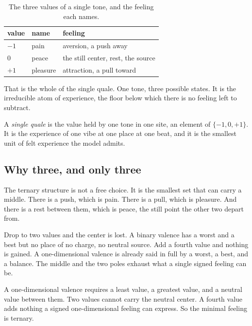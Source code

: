 \begin{table}[ht]
\centering
\begin{tabular}{@{}lll@{}}
\toprule
value & name & feeling \\
\midrule
$-1$ & pain & aversion, a push away \\
$0$ & peace & the still center, rest, the source \\
$+1$ & pleasure & attraction, a pull toward \\
\bottomrule
\end{tabular}
\caption{The three values of a single tone, and the feeling each names.}
\label{tab:single-tone-values}
\end{table}

That is the whole of the single quale. One tone, three possible states. It is the irreducible atom of experience, the floor below which there is no feeling left to subtract.

\begin{definition}
A \emph{single quale} is the value held by one tone in one site, an element of $\{-1, 0, +1\}$. It is the experience of one vibe at one place at one beat, and it is the smallest unit of felt experience the model admits.
\end{definition}

\subsection{Why three, and only three}

The ternary structure is not a free choice. It is the smallest set that can carry a middle. There is a push, which is pain. There is a pull, which is pleasure. And there is a rest between them, which is peace, the still point the other two depart from.

Drop to two values and the center is lost. A binary valence has a worst and a best but no place of no charge, no neutral source. Add a fourth value and nothing is gained. A one-dimensional valence is already said in full by a worst, a best, and a balance. The middle and the two poles exhaust what a single signed feeling can be.

\begin{proposition}
A one-dimensional valence requires a least value, a greatest value, and a neutral value between them. Two values cannot carry the neutral center. A fourth value adds nothing a signed one-dimensional feeling can express. So the minimal feeling is ternary.
\end{proposition}

